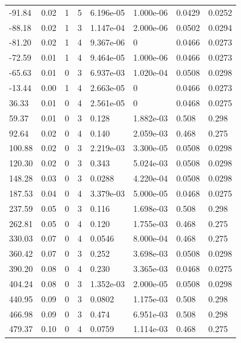 \documentclass[preview]{standalone}
\begin{document}
{{\begin{tabular}{L{1.2cm}C{1.2cm} C{0.3cm}C{0.5cm} C{1.4cm}C{1.4cm} C{1.4cm}C{1.4cm}}
  -91.84  &  0.02  & 1     &  5 &  6.196e-05  & 1.000e-06  & 0.0429 &  0.0252   \\ 
  -88.18  &  0.02  & 1     &  3 &  1.147e-04  & 2.000e-06  & 0.0502 &  0.0294   \\ 
  -81.20  &  0.02  & 1     &  4 &  9.367e-06  & 0  & 0.0466 &  0.0273   \\ 
  -72.59  &  0.01  & 1     &  4 &  9.464e-05  & 1.000e-06  & 0.0466 &  0.0273   \\ 
  -65.63  &  0.01  & 0     &  3 &  6.937e-03  & 1.020e-04  & 0.0508 &  0.0298   \\ 
  -13.44  &  0.00  & 1     &  4 &  2.663e-05  & 0  & 0.0466 &  0.0273   \\ 
  36.33  &  0.01  & 0     &  4 &  2.561e-05  & 0  & 0.0468 &  0.0275   \\ 
  59.37  &  0.01  & 0     &  3 &  0.128  & 1.882e-03  & 0.508 &  0.298   \\ 
  92.64  &  0.02  & 0     &  4 &  0.140  & 2.059e-03  & 0.468 &  0.275   \\ 
  100.88  &  0.02  & 0     &  3 &  2.219e-03  & 3.300e-05  & 0.0508 &  0.0298   \\ 
  120.30  &  0.02  & 0     &  3 &  0.343  & 5.024e-03  & 0.0508 &  0.0298   \\ 
  148.28  &  0.03  & 0     &  3 &  0.0288  & 4.220e-04  & 0.0508 &  0.0298   \\ 
  187.53  &  0.04  & 0     &  4 &  3.379e-03  & 5.000e-05  & 0.0468 &  0.0275   \\ 
  237.59  &  0.05  & 0     &  3 &  0.116  & 1.698e-03  & 0.508 &  0.298   \\ 
  262.81  &  0.05  & 0     &  4 &  0.120  & 1.755e-03  & 0.468 &  0.275   \\ 
  330.03  &  0.07  & 0     &  4 &  0.0546  & 8.000e-04  & 0.468 &  0.275   \\ 
  360.42  &  0.07  & 0     &  3 &  0.252  & 3.698e-03  & 0.0508 &  0.0298   \\ 
  390.20  &  0.08  & 0     &  4 &  0.230  & 3.365e-03  & 0.0468 &  0.0275   \\ 
  404.24  &  0.08  & 0     &  3 &  1.352e-03  & 2.000e-05  & 0.0508 &  0.0298   \\ 
  440.95  &  0.09  & 0     &  3 &  0.0802  & 1.175e-03  & 0.508 &  0.298   \\ 
  466.98  &  0.09  & 0     &  3 &  0.474  & 6.951e-03  & 0.508 &  0.298   \\ 
  479.37  &  0.10  & 0     &  4 &  0.0759  & 1.114e-03  & 0.468 &  0.275   \\ 

\end{tabular}}}
\end{document}
